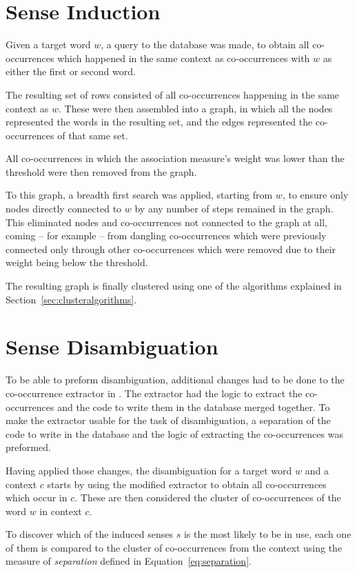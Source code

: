 \section{Sense Induction}

Given a target word $w$, a query to the database was made, to obtain all
co-occurrences which happened in the same context as co-occurrences with $w$ as
either the first or second word.

The resulting set of rows consisted of all co-occurrences happening in the same
context as $w$. These were then assembled into a graph, in which all the nodes
represented the words in the resulting set, and the edges represented the
co-occurrences of that same set.

All co-occurrences in which the association measure's weight was lower than the
threshold were then removed from the graph.

To this graph, a breadth first search was applied, starting from $w$, to ensure
only nodes directly connected to $w$ by any number of steps remained in the
graph. This eliminated nodes and co-occurrences not connected to the graph at
all, coming -- for example -- from dangling co-occurrences which were previously
connected only through other co-occurrences which were removed due to their
weight being below the threshold.

The resulting graph is finally clustered using one of the algorithms explained
in Section~\ref{sec:clusteralgorithms}.

\section{Sense Disambiguation}

To be able to preform disambiguation, additional changes had to be done to the
co-occurrence extractor in \cite{correia2015syntax}. The extractor had the logic
to extract the co-occurrences and the code to write them in the database merged
together. To make the extractor usable for the task of disambiguation, a
separation of the code to write in the database and the logic of extracting the
co-occurrences was preformed.

Having applied those changes, the disambiguation for a target word $w$ and a
context $c$ starts by using the modified extractor to obtain all co-occurrences
which occur in $c$. These are then considered the cluster of co-occurrences of
the word $w$ in context $c$.

To discover which of the induced senses $s$ is the most likely to be in use,
each one of them is compared to the cluster of co-occurrences from the context
using the measure of \emph{separation} defined in Equation~\ref{eq:separation}.

